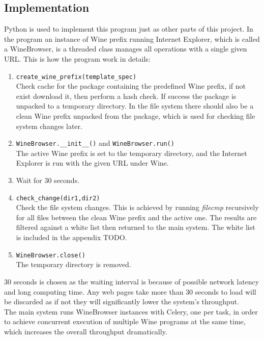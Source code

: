 \subsection{Implementation}
Python is used to implement this program just as other parts of this project. 
In the program an instance of Wine prefix running Internet Explorer, which is called 
a WineBrowser, is a threaded class manages all operations with a single 
given URL. This is how the program work in details:
\begin{enumerate}
\item \verb`create_wine_prefix(template_spec)` \\
Check cache for the package containing the predefined Wine prefix, if not 
exist download it, then perform a hash check.
If success the package is unpacked to a temporary directory. 
In the file system there should also be a clean Wine prefix unpacked from the 
package, which is used for checking file system changes later. 
\item \verb`WineBrowser.__init__()` and \verb`WineBrowser.run()`\\
The active Wine prefix is set to the temporary directory, and the Internet 
Explorer is run with the given URL under Wine. 
\item
Wait for 30 seconds.
\item \verb`check_change(dir1,dir2)`\\
Check the file system changes. This is achieved by running {\em filecmp} recursively 
for all files between the clean Wine prefix and the active one. The results 
are filtered against a white list then returned to the main system. The white 
list is included in the appendix TODO. 
\item \verb`WineBrowser.close()`\\
The temporary directory is removed. 
\end{enumerate}
30 seconds is chosen as the waiting interval is because of possible network 
latency and long computing time. Any web pages take more than 30 seconds to 
load will be discarded as if not they will significantly lower the system's 
throughput. \\
The main system runs WineBrowser instances with Celery, one per task, in order 
to achieve concurrent execution of multiple Wine programs at the same time, 
which increases the overall throughput dramatically. 